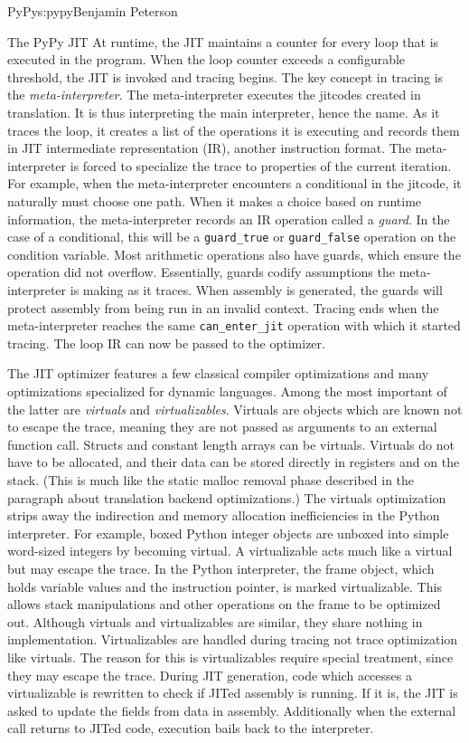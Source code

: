 \begin{aosachapter}{PyPy}{s:pypy}{Benjamin Peterson}
\begin{aosasect1}{The PyPy JIT}
At runtime, the JIT maintains a counter for every loop that is executed in the
program. When the loop counter exceeds a configurable threshold, the JIT is
invoked and tracing begins. The key concept in tracing is the
\emph{meta-interpreter}. The meta-interpreter executes the jitcodes created in
translation. It is thus interpreting the main interpreter, hence the name. As it
traces the loop, it creates a list of the operations it is executing and records
them in JIT intermediate representation (IR), another instruction format. The
meta-interpreter is forced to specialize the trace to properties of the current
iteration. For example, when the meta-interpreter encounters a conditional in
the jitcode, it naturally must choose one path. When it makes a choice based on
runtime information, the meta-interpreter records an IR operation called a
\emph{guard}. In the case of a conditional, this will be a \verb+guard_true+ or
\verb+guard_false+ operation on the condition variable. Most arithmetic
operations also have guards, which ensure the operation did not
overflow. Essentially, guards codify assumptions the meta-interpreter is making
as it traces. When assembly is generated, the guards will protect assembly from
being run in an invalid context. Tracing ends when the meta-interpreter reaches
the same \verb+can_enter_jit+ operation with which it started tracing. The loop
IR can now be passed to the optimizer.

The JIT optimizer features a few classical compiler optimizations and many
optimizations specialized for dynamic languages. Among the most important of the
latter are \emph{virtuals} and \emph{virtualizables}. Virtuals are objects which
are known not to escape the trace, meaning they are not passed as arguments to
an external function call. Structs and constant length arrays can be
virtuals. Virtuals do not have to be allocated, and their data can be stored
directly in registers and on the stack. (This is much like the static malloc
removal phase described in the paragraph about translation backend
optimizations.) The virtuals optimization strips away the indirection and memory
allocation inefficiencies in the Python interpreter. For example, boxed Python
integer objects are unboxed into simple word-sized integers by becoming
virtual. A virtualizable acts much like a virtual but may escape the trace. In
the Python interpreter, the frame object, which holds variable values and the
instruction pointer, is marked virtualizable. This allows stack manipulations
and other operations on the frame to be optimized out. Although virtuals and
virtualizables are similar, they share nothing in implementation. Virtualizables
are handled during tracing not trace optimization like virtuals. The reason for
this is virtualizables require special treatment, since they may escape the
trace. During JIT generation, code which accesses a virtualizable is rewritten
to check if JITed assembly is running. If it is, the JIT is asked to update the
fields from data in assembly. Additionally when the external call returns to
JITed code, execution bails back to the interpreter.


\end{aosasect1}
\end{aosachapter}
